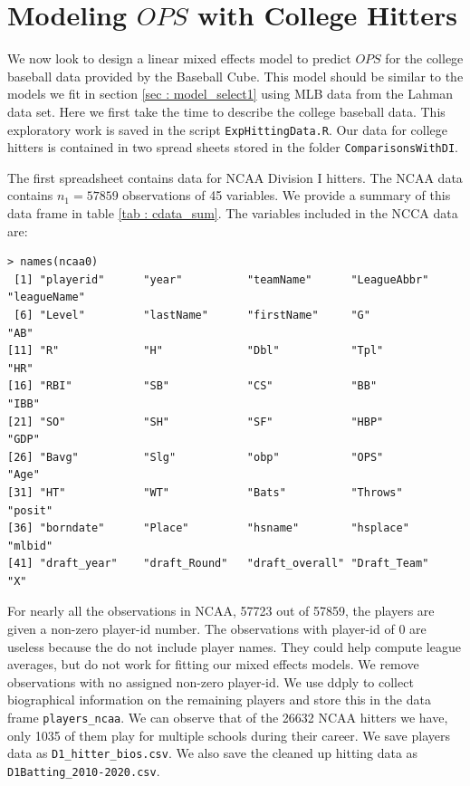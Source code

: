 \documentclass [52pt] {article}
\begin{document}
\section{Modeling $OPS$ with College Hitters}
We now look to design a  linear mixed effects model to predict $OPS$ for the college baseball data provided by the Baseball Cube.  This model should be similar to the models we fit in section  \ref{sec : model_select1} using MLB data from the Lahman data set.  Here we first take the time to describe the college baseball data.  This exploratory work is saved in the script \verb|ExpHittingData.R|.  Our data for college hitters is contained in two spread sheets stored in the folder \verb|ComparisonsWithDI|.  

The first spreadsheet contains data for NCAA Division I hitters.  The NCAA data contains $n_1 = 57859$ observations of 45 variables.  We provide a summary of this data frame in table \ref{tab : cdata_sum}.  The variables included in the NCCA data are:
\begin{verbatim}
> names(ncaa0)
 [1] "playerid"      "year"          "teamName"      "LeagueAbbr"    "leagueName"   
 [6] "Level"         "lastName"      "firstName"     "G"             "AB"           
[11] "R"             "H"             "Dbl"           "Tpl"           "HR"           
[16] "RBI"           "SB"            "CS"            "BB"            "IBB"          
[21] "SO"            "SH"            "SF"            "HBP"           "GDP"          
[26] "Bavg"          "Slg"           "obp"           "OPS"           "Age"          
[31] "HT"            "WT"            "Bats"          "Throws"        "posit"        
[36] "borndate"      "Place"         "hsname"        "hsplace"       "mlbid"        
[41] "draft_year"    "draft_Round"   "draft_overall" "Draft_Team"    "X"  
\end{verbatim}
For nearly all the observations in NCAA, 57723 out of 57859, the players are given a non-zero player-id number.  The observations with player-id of 0 are useless because the do not include player names.  They could help compute league averages, but do not work for fitting our mixed effects models.  We remove observations with no assigned non-zero player-id.  We use ddply to collect biographical information on the remaining players and store this in the data frame \verb|players_ncaa|.  We can observe that of the 26632 NCAA hitters we have, only 1035 of them play for multiple schools during their career.   We save players data as \verb|D1_hitter_bios.csv|.  We also save the cleaned up hitting data as \verb|D1Batting_2010-2020.csv|.
\end{document}
